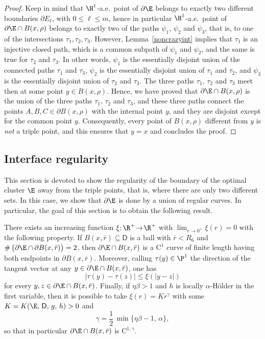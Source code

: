 \begin{proof}
Keep in mind that $\H^1$-a.e.\ point of $\partial \E$ belongs to exactly two different boundaries $\partial E_\ell$, with $0\leq \ell\leq m$, hence in particular $\H^1$-a.e.\ point of $\partial\E\cap B(x,\rho)$ belongs to exactly two of the paths $\psi_1,\,\psi_2$ and $\psi_3$, that is, to one of the intersections $\tau_1,\tau_2,\tau_3$. However, Lemma~\ref{noncrazyint} implies that $\tau_1$ is an injective closed path, which is a common subpath of $\psi_1$ and $\psi_2$, and the same is true for $\tau_2$ and $\tau_3$. In other words, $\psi_1$ is the essentially disjoint union of the connected paths $\tau_1$ and $\tau_3$, $\psi_2$ is the essentially disjoint union of $\tau_1$ and $\tau_2$, and $\psi_3$ is the essentially disjoint union of $\tau_2$ and $\tau_3$. The three paths $\tau_1,\,\tau_2$ and $\tau_3$ meet then at some point $y\in B(x,\rho)$. Hence, we have proved that $\partial\E\cap B(x,\rho)$ is the union of the three paths $\tau_1,\,\tau_2$ and $\tau_3$, and these three paths connect the points $A,B,C \in \partial B(x,\rho)$ with the internal point $y$, and they are disjoint except for the common point $y$. Consequently, every point of $B(x,\rho)$ different from $y$ is \emph{not} a triple point, and this ensures that $y=x$ and concludes the proof.
\end{proof}

\subsection{Interface regularity\label{s:interface}}

This section is devoted to show the regularity of the boundary of the optimal cluster $\E$ away from the triple points, that is, where there are only two different sets. In this case, we show that $\partial\E$ is done by a union of regular curves. In particular, the goal of this section is to obtain the following result.

\begin{prop}\label{step6}
There exists an increasing function \hbox{$\xi{:}\,\R^+\!\to\!\R^+$} with $\lim_{r\to 0^+} \xi(r)=0$ with the following property. If $B(x,\bar r)\subseteq \mathsf{D}$ is a ball with $\bar r<R_6$ and $\#\, \big(\partial \E\cap \partial B(x,\bar r)\big)=2$, then $\partial\E\cap B(x,\bar r)$ is a $\mathrm{C}^1$ curve of finite length having both endpoints in $\partial B(x,\bar r)$. Moreover, calling $\tau(y)\in\P^1$ the direction of the tangent vector at any $y\in\partial\E\cap B(x,\bar r)$, one has
\begin{equation}\label{uniformC1}
|\tau(y)-\tau(z)| \leq \xi(|y-z|)
\end{equation}
for every $y,z\in \partial\E\cap B(x,\bar r)$. Finally, if $\eta\beta>1$ and $h$ is locally $\alpha$-H\"older in the first variable, then it is possible to take $\xi(r)=K r^\gamma$ with some $K=K(\E,\, \mathsf{D},\, g,\,h)>0$ and
\begin{equation}\label{heregamma}
\gamma=\frac 12\, \min\{\eta\beta-1,\, \alpha\},
\end{equation}
so that in particular $\partial\E\cap B(x,\bar r)$ is $\mathrm{C}^{1,\gamma}$.
\end{prop}

